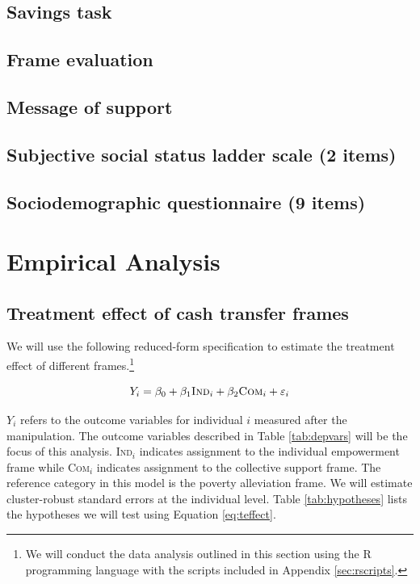 \documentclass[11pt, a4paper]{article}\usepackage[]{graphicx}\usepackage[]{color}
\begin{document}
    \subsection{Savings task}
    \subsection{Frame evaluation}
    \subsection{Message of support}
    \subsection{Subjective social status ladder scale (2 items)}
    \subsection{Sociodemographic questionnaire (9 items)}

\section{Empirical Analysis}

    \subsection{Treatment effect of cash transfer frames}


        We will use the following reduced-form specification to estimate the treatment effect of different frames.\footnote{We will conduct the data analysis outlined in this section using the R programming language with the scripts included in Appendix \ref{sec:rscripts}.}

  		\begin{equation} \label{eq:teffect}
            Y_{i} = \beta_{0} + \beta_{1}\text{\textsc{Ind}}_{i} + \beta_{2}\text{\textsc{Com}}_{i} + \varepsilon_{i}
		\end{equation}

        $Y_{i}$ refers to the outcome variables for individual $i$ measured after the manipulation. The outcome variables described in Table \ref{tab:depvars} will be the focus of this analysis. \textsc{Ind}$_{i}$ indicates assignment to the individual empowerment frame while \textsc{Com}$_{i}$ indicates assignment to the collective support frame. The reference category in this model is the poverty alleviation frame. We will estimate cluster-robust standard errors at the individual level. Table \ref{tab:hypotheses} lists the hypotheses we will test using Equation \ref{eq:teffect}.
\end{document}

